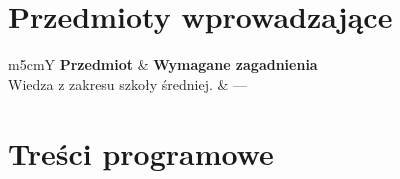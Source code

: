 \documentclass[12pt, a4paper]{article}
\newcommand{\thdrule}{\noalign{\global\setlength{\extrarowheight}{0pt}}}
\newcommand{\thdend}{\noalign{\global\setlength{\extrarowheight}{3pt}}}
\begin{document}
\section{Przedmioty wprowadzające}

{\scriptsize
\begin{tabularx}{\textwidth}{m{5cm}Y}
\thdrule\toprule
{} {\color{white}\textbf{Przedmiot}} & {\color{white}\textbf{Wymagane zagadnienia}} \\
\midrule\thdend
   Wiedza z zakresu szkoły średniej. & --- \\
\bottomrule
\end{tabularx}}

\section{Treści programowe}
\end{document}

